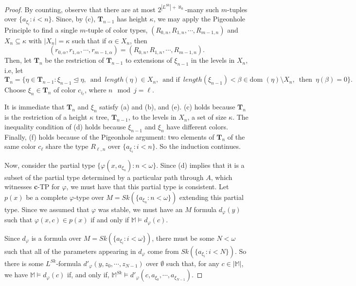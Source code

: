 \documentclass{article}
\newcommand{\bbM}{\mathbb{M}}
\newcommand{\dom}{\text{dom }}
\newcommand{\vphi}{\varphi}
\theoremstyle{definition}
\theoremstyle{definition}
\theoremstyle{definition}
\theoremstyle{definition}
\begin{document}
\begin{proof}
    By counting, observe that there are at most $2^{|L^{Sk}|+\aleph_0}$-many such $m$-tuples over $\{a_{\xi_i}\colon i<n\}$. Since, by (c), $\textbf{T}_{n-1}$ has height $\kappa$, we may apply the Pigeonhole Principle to find a single $m$-tuple of color types, $(R_{0,n},R_{1,n},\dotsm, R_{m-1,n})$
     and $X_n\subseteq \kappa$ with $|X_n|=\kappa$ such that if $\alpha\in X_n$, then $$(r_{0,\alpha},r_{1,\alpha},\dotsm, r_{m-1,\alpha})=(R_{0,n},R_{1,n},\dotsm, R_{m-1,n}).$$
     Then, let $\textbf{T}_n$ be the restriction of $\textbf{T}_{n-1}$ to extensions of $\xi_{n-1}$ in the levels in $X_n$, i.e, let
     $$\textbf{T}_n=\{\eta\in \textbf{T}_{n-1}\colon \xi_{n-1}\trianglelefteq\eta,\enspace\text{and}\enspace length(\eta)\in X_n,\enspace\text{and if}\enspace length(\xi_{n-1})<\beta \in\dom(\eta)\setminus X_n,\enspace\text{then}\enspace \eta(\beta)=0\}.$$
     Choose $\xi_n\in\textbf{T}_n$ of color $c_{i_\ell}$, where $n\mod j=\ell$.

    It is immediate that $\textbf{T}_n$ and $\xi_n$ satisfy (a) and (b), and (e). (c) holds because $\textbf{T}_n$ is the restriction of a height $\kappa$ tree, $\textbf{T}_{n-1}$, to the levels in $X_n$, a set of size $\kappa$. The inequality condition of (d) holds because $\xi_{n-1}$ and $\xi_n$ have different colors. Finally, (f) holds because of the Pigeonhole argument: two elements of $\textbf{T}_n$ of the same color $c_\ell$ share the type $R_{\ell,n}$ over $\{a_{\xi_i}\colon i<n\}$. So the induction continues.

     Now, consider the partial type $\{\vphi(x, a_{\xi_n})\colon n< \omega\}$. Since (d) implies that it is a subset of the partial type determined by a particular path through $A$, which witnesses \textbf{c}-TP for $\vphi$, we must have that this partial type is consistent. Let $p(x)$ be a complete $\vphi$-type over  $M=Sk(\{a_{\xi_n}\colon n<\omega\})$ extending this partial type. %
    Since we assumed that $\vphi$ was stable, we must have an $M$ formula $d_\vphi(y)$ such that $\vphi(x,c)\in p(x)$ if and only if $\bbM\models d_\vphi(c)$. 

    Since $d_\vphi$ is a formula over $M=Sk(\{a_{\xi_i}\colon i<\omega\})$, there must be some $N<\omega$ such that all of the parameters appearing in $d_\vphi$ come from $Sk(\{a_{\xi_i}\colon i<N\})$.  So there is some $L^{Sk}$-formula $d'_\vphi(y,z_0,\dotsm, z_{N-1})$ over $\emptyset$ such that, for any $c\in|\bbM|$, we have $\bbM\models d_\vphi(c)$ if, and only if, $\bbM^{Sk}\models d'_\vphi(c,a_{\xi_0},\dotsm, a_{\xi_{N-1}})$.
    

\end{proof}
\end{document}
